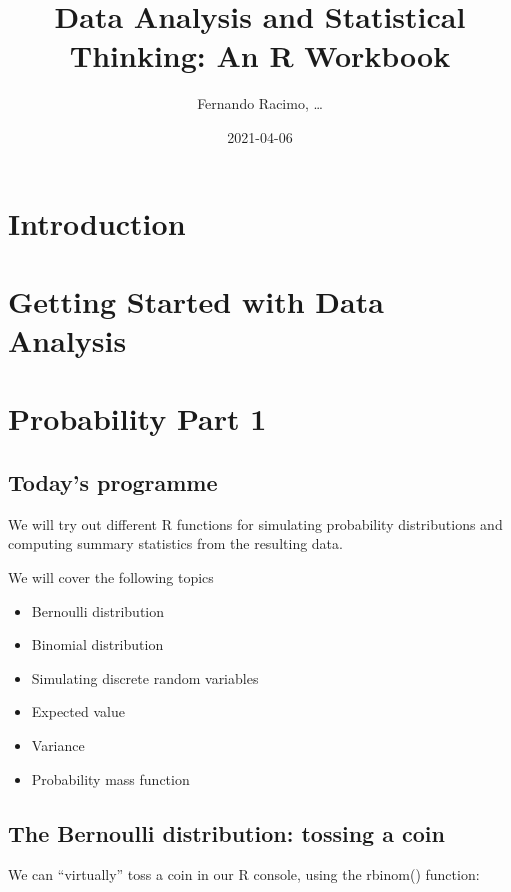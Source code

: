 \documentclass[
]{book}
\title{Data Analysis and Statistical Thinking: An R Workbook}
\author{Fernando Racimo, \ldots{}}
\date{2021-04-06}
\providecommand{\tightlist}{%
  \setlength{\itemsep}{0pt}\setlength{\parskip}{0pt}}
\begin{document}
\maketitle

{
\setcounter{tocdepth}{1}
\tableofcontents
}
\hypertarget{introduction}{%
\chapter{Introduction}\label{introduction}}

\hypertarget{intro}{%
\chapter{Getting Started with Data Analysis}\label{intro}}

\hypertarget{prob1}{%
\chapter{Probability Part 1}\label{prob1}}

\hypertarget{todays-programme}{%
\section{Today's programme}\label{todays-programme}}

We will try out different R functions for simulating probability distributions and computing summary statistics from the resulting data.

We will cover the following topics

\begin{itemize}
\tightlist
\item
  Bernoulli distribution
\item
  Binomial distribution
\item
  Simulating discrete random variables
\item
  Expected value
\item
  Variance
\item
  Probability mass function
\end{itemize}

\hypertarget{the-bernoulli-distribution-tossing-a-coin}{%
\section{The Bernoulli distribution: tossing a coin}\label{the-bernoulli-distribution-tossing-a-coin}}

We can ``virtually'' toss a coin in our R console, using the rbinom() function:
\end{document}
